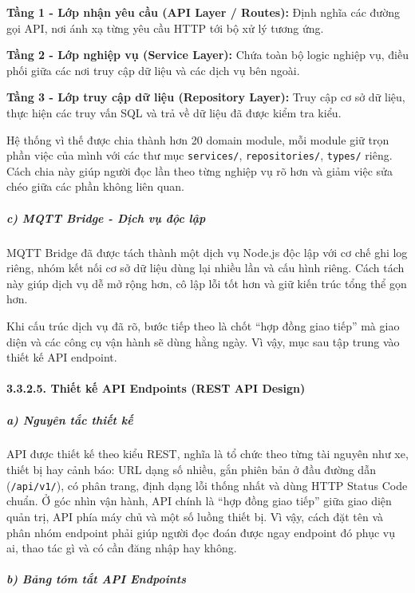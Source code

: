 \documentclass[a4paper]{extarticle}
\begin{document}
\textbf{Tầng 1 - Lớp nhận yêu cầu (API Layer / Routes):} Định nghĩa các
đường gọi API, nơi ánh xạ từng yêu cầu HTTP tới bộ xử lý tương ứng.

\textbf{Tầng 2 - Lớp nghiệp vụ (Service Layer):} Chứa toàn bộ logic
nghiệp vụ, điều phối giữa các nơi truy cập dữ liệu và các dịch vụ bên ngoài.

\textbf{Tầng 3 - Lớp truy cập dữ liệu (Repository Layer):} Truy cập cơ sở dữ
liệu, thực hiện các truy vấn SQL và trả về dữ liệu đã được kiểm tra kiểu.

Hệ thống vì thế được chia thành hơn 20 domain module, mỗi module giữ
trọn phần việc của mình với các thư mục \texttt{services/},
\texttt{repositories/}, \texttt{types/} riêng. Cách chia này giúp người
đọc lần theo từng nghiệp vụ rõ hơn và giảm việc sửa chéo giữa các phần
không liên quan.

\subparagraph{c) MQTT Bridge - Dịch vụ độc
lập}\label{c-mqtt-bridge---dux1ecbch-vux1ee5-ux111ux1ed9c-lux1eadp}

MQTT Bridge đã được tách thành một dịch vụ Node.js độc lập với cơ chế ghi
log riêng, nhóm kết nối cơ sở dữ
liệu dùng lại nhiều lần và cấu hình riêng. Cách tách này giúp dịch vụ dễ
mở rộng hơn, cô lập lỗi tốt hơn và giữ kiến trúc tổng thể gọn hơn.

Khi cấu trúc dịch vụ đã rõ, bước tiếp theo là chốt ``hợp đồng giao
tiếp'' mà giao diện và các công cụ vận hành sẽ dùng hằng ngày. Vì vậy,
mục sau tập trung vào thiết kế API endpoint.

\paragraph{3.3.2.5. Thiết kế API Endpoints (REST API
Design)}\label{3235-thiux1ebft-kux1ebf-api-endpoints-rest-api-design}

\subparagraph{a) Nguyên tắc thiết
kế}\label{a-nguyuxean-tux1eafc-thiux1ebft-kux1ebf}

API được thiết kế theo kiểu REST, nghĩa là tổ chức theo từng tài nguyên
như xe, thiết bị hay cảnh báo: URL dạng số nhiều, gắn phiên bản ở đầu
đường dẫn (\texttt{/api/v1/}), có phân trang, định dạng lỗi thống nhất
và dùng HTTP Status Code chuẩn. Ở góc nhìn vận hành, API chính là ``hợp
đồng giao tiếp'' giữa giao diện quản trị, API phía máy chủ và một số
luồng thiết bị. Vì vậy, cách đặt tên và phân nhóm endpoint phải giúp
người đọc đoán được ngay endpoint đó phục vụ ai, thao tác gì và có cần
đăng nhập hay không.

\subparagraph{b) Bảng tóm tắt API
Endpoints}\label{b-bux1ea3ng-tuxf3m-tux1eaft-api-endpoints}
\end{document}
